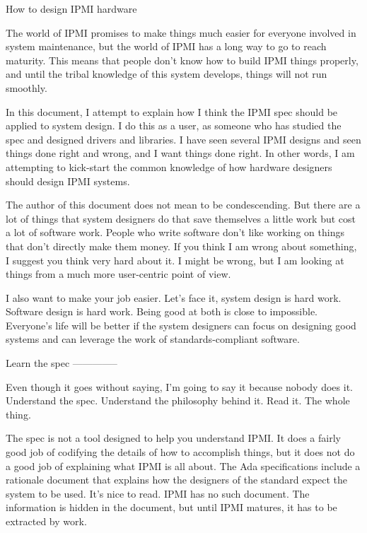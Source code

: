 

                    How to design IPMI hardware


The world of IPMI promises to make things much easier for everyone
involved in system maintenance, but the world of IPMI has a long way
to go to reach maturity.  This means that people don't know how to
build IPMI things properly, and until the tribal knowledge of this
system develops, things will not run smoothly.

In this document, I attempt to explain how I think the IPMI spec
should be applied to system design.  I do this as a user, as someone
who has studied the spec and designed drivers and libraries.  I have
seen several IPMI designs and seen things done right and wrong, and I
want things done right.  In other words, I am attempting to kick-start
the common knowledge of how hardware designers should design IPMI
systems.

The author of this document does not mean to be condescending.  But
there are a lot of things that system designers do that save
themselves a little work but cost a lot of software work.  People who
write software don't like working on things that don't directly make
them money.  If you think I am wrong about something, I suggest you
think very hard about it.  I might be wrong, but I am looking at
things from a much more user-centric point of view.

I also want to make your job easier.  Let's face it, system design is
hard work.  Software design is hard work.  Being good at both is close
to impossible.  Everyone's life will be better if the system designers
can focus on designing good systems and can leverage the work of
standards-compliant software.


Learn the spec
--------------

Even though it goes without saying, I'm going to say it because nobody
does it.  Understand the spec.  Understand the philosophy behind it.
Read it.  The whole thing.

The spec is not a tool designed to help you understand IPMI.  It does
a fairly good job of codifying the details of how to accomplish
things, but it does not do a good job of explaining what IPMI is all
about.  The Ada specifications include a rationale document that
explains how the designers of the standard expect the system to be
used.  It's nice to read.  IPMI has no such document.  The information
is hidden in the document, but until IPMI matures, it has to be
extracted by work.


